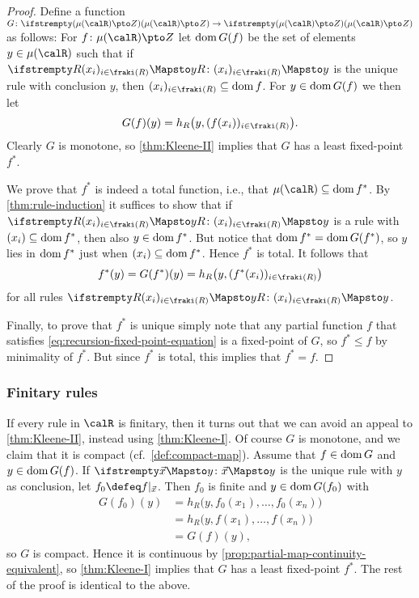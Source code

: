 \begin{proof}
    Define a function $G \colon \pmaps{\lfp{\calR}}{Z} \to \pmaps{\lfp{\calR}}{Z}$ as follows: For $f \colon \lfp{\calR} \pto Z$ let $\operatorname{dom} G(f)$ be the set of elements $y \in \lfp{\calR}$ such that if $\myinfrule{R}{(x_i)_{i \in \idxset{R}}}{y}$ is the unique rule with conclusion $y$, then $(x_i)_{i \in \idxset{R}} \subseteq \dom f$. For $y \in \operatorname{dom} G(f)$ we then let
    \begin{equation*}
        G(f)(y)
            = h_R \bigl( y, (f(x_i))_{i \in \idxset{R}} \bigr).
    \end{equation*}
    Clearly $G$ is monotone, so \cref{thm:Kleene-II} implies that $G$ has a least fixed-point $f^*$.

    We prove that $f^*$ is indeed a total function, i.e., that $\lfp{\calR} \subseteq \dom f^*$. By \cref{thm:rule-induction} it suffices to show that if $\myinfrule{R}{(x_i)_{i \in \idxset{R}}}{y}$ is a rule with $(x_i) \subseteq \operatorname{dom} f^*$, then also $y \in \operatorname{dom} f^*$. But notice that $\operatorname{dom} f^* = \operatorname{dom} G(f^*)$, so $y$ lies in $\operatorname{dom} f^*$ just when $(x_i) \subseteq \operatorname{dom} f^*$. Hence $f^*$ is total. It follows that
    \begin{equation*}
        f^*(y)
            = G(f^*)(y)
            = h_R \bigl( y, (f^*(x_i))_{i \in \idxset{R}} \bigr)
    \end{equation*}
    for all rules $\myinfrule{R}{(x_i)_{i \in \idxset{R}}}{y}$.

    Finally, to prove that $f^*$ is unique simply note that any partial function $f$ that satisfies \cref{eq:recursion-fixed-point-equation} is a fixed-point of $G$, so $f^* \leq f$ by minimality of $f^*$. But since $f^*$ is total, this implies that $f^* = f$.
\end{proof}



\subsubsection{Finitary rules}

If every rule in $\calR$ is finitary, then it turns out that we can avoid an appeal to \cref{thm:Kleene-II}, instead using \cref{thm:Kleene-I}. Of course $G$ is monotone, and we claim that it is compact (cf.~\cref{def:compact-map}). Assume that $f \in \operatorname{dom} G$ and $y \in \operatorname{dom} G(f)$. If $\myinfrule{}{\seq{x}}{y}$ is the unique rule with $y$ as conclusion, let $f_0 \defeq f|_{\seq{x}}$. Then $f_0$ is finite and $y \in \operatorname{dom} G(f_0)$ with
%
\begin{align*}
    G(f_0)(y)
        &= h_R \bigl( y, f_0(x_1), \ldots, f_0(x_n) \bigr) \\
        &= h_R \bigl( y, f(x_1), \ldots, f(x_n) \bigr) \\
        &= G(f)(y),
\end{align*}
%
so $G$ is compact. Hence it is continuous by \cref{prop:partial-map-continuity-equivalent}, so \cref{thm:Kleene-I} implies that $G$ has a least fixed-point $f^*$. The rest of the proof is identical to the above.


